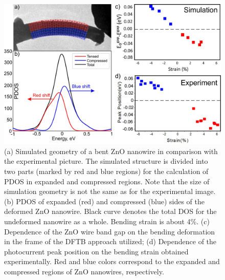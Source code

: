 \begin{figure}  
\includegraphics[width=\textwidth]{figures/figure5_3}
\caption[DFTB simulation match experimental result]{(a) Simulated geometry of a bent ZnO nanowire in comparison with the experimental picture. The simulated structure is divided into two parts (marked by red and blue regions) for the calculation of PDOS in expanded and compressed regions. Note that the size of simulation geometry is not the same as for the experimental image. (b) PDOS of expanded (red) and compressed (blue) sides of the deformed ZnO nanowire. Black curve denotes the total DOS for the undeformed nanowire as a whole. Bending strain is about 4\%. (c) Dependence of the ZnO wire band gap on the bending deformation in the frame of the DFTB approach utilized; (d) Dependence of the photocurrent peak position on the bending strain obtained experimentally. Red and blue colors correspond to the expanded and compressed regions of ZnO nanowires, respectively. 
\label{fig:5_3}}
\end{figure}


